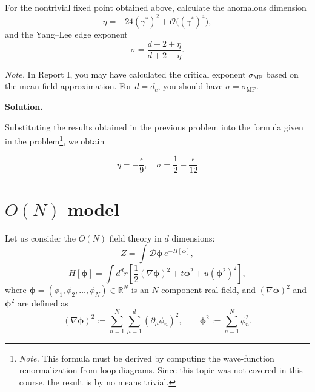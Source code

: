 \documentclass[11pt,a4paper]{article}
\newcounter{problem}
\newcounter{saveequation}
\newenvironment{solution}
{
	\par
	\setcounter{saveequation}{\value{equation}}
	\begingroup
	\setcounter{equation}{0}
	\renewcommand{\theequation}{\arabic{problem}.\arabic{equation}}
	\renewcommand{\theHequation}{sol.\arabic{problem}.\arabic{equation}}
	\noindent\textbf{Solution.}\quad
}
{
	\par
	\endgroup
	\setcounter{equation}{\value{saveequation}}
}
\begin{document}
	\begin{problembox}
		For the nontrivial fixed point obtained above, calculate the anomalous dimension
		\begin{equation}
			\eta=-24(\gamma^*)^2+\mathcal{O}\bigl((\gamma^*)^4\bigr),
		\end{equation}
		and the Yang--Lee edge exponent
		\begin{equation}
			\sigma=\frac{d-2+\eta}{d+2-\eta}.
		\end{equation}

		\textit{Note.} In Report I, you may have calculated the critical exponent $\sigma_{\mathrm{MF}}$ based on the mean-field approximation. For $d=d_c$, you should have $\sigma=\sigma_{\mathrm{MF}}$.
	\end{problembox}
	\begin{solution}
		Substituting the results obtained in the previous problem into the formula given in the problem\footnote{\textit{Note.} This formula must be derived by computing the wave-function renormalization from loop diagrams. Since this topic was not covered in this course, the result is by no means trivial.}, we obtain
		\begin{finalanswer}
			\begin{equation}
				\label{fin:10}
				\eta=-\frac{\epsilon}{9},\quad \sigma=\frac12 - \frac{\epsilon}{12}
			\end{equation}
		\end{finalanswer}
	\end{solution}



	\section{\texorpdfstring{$O(N)$}{O(N)} model}
	\label{prob:3}
	Let us consider the $O(N)$ field theory in $d$ dimensions:
	\begin{equation}
		Z=\int \mathcal{D}\boldsymbol{\phi}\,e^{-H[\boldsymbol{\phi}]},
	\end{equation}
	\begin{equation}
		H[\boldsymbol{\phi}]=\int d^d r\left[\frac{1}{2}(\nabla\boldsymbol{\phi})^2+t\boldsymbol{\phi}^2+u(\boldsymbol{\phi}^2)^2\right],
	\end{equation}
	where $\boldsymbol{\phi}=(\phi_1,\phi_2,\ldots,\phi_N)\in\mathbb{R}^N$ is an $N$-component real field, and $(\nabla\boldsymbol{\phi})^2$ and $\boldsymbol{\phi}^2$ are defined as
	\begin{equation}
		(\nabla\boldsymbol{\phi})^2:=\sum_{n=1}^{N}\sum_{\mu=1}^{d}(\partial_\mu\phi_n)^2,
		\qquad
		\boldsymbol{\phi}^2:=\sum_{n=1}^{N}\phi_n^2.
	\end{equation}
\end{document}
